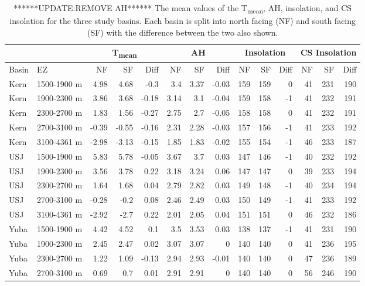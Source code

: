 \begin{table}[htbp]
\centering
\caption{******UPDATE:REMOVE AH****** The mean values of the T\textsubscript{mean}, AH, insolation, and CS insolation for the three study basins. Each basin is split into north facing (NF) and south facing (SF) with the difference between the two also shown.}
\label{tab:met_metric_table}
\tiny 
\begin{tabular}{llrrrrrrrrrrrr}
\toprule
& & \multicolumn{3}{c}{T\textsubscript{mean}} & \multicolumn{3}{c}{AH} & \multicolumn{3}{c}{Insolation} & \multicolumn{3}{c}{CS Insolation} \\
\midrule
Basin & EZ & NF & SF & Diff & NF & SF & Diff & NF & SF & Diff & NF & SF & Diff \\
\midrule
Kern & 1500-1900 m & 4.98 & 4.68 & -0.3 & 3.4 & 3.37 & -0.03 & 159 & 159 & 0 & 41 & 231 & 190 \\
Kern & 1900-2300 m & 3.86 & 3.68 & -0.18 & 3.14 & 3.1 & -0.04 & 159 & 158 & -1 & 41 & 232 & 191 \\
Kern & 2300-2700 m & 1.83 & 1.56 & -0.27 & 2.75 & 2.7 & -0.05 & 158 & 158 & 0 & 41 & 232 & 191 \\
Kern & 2700-3100 m & -0.39 & -0.55 & -0.16 & 2.31 & 2.28 & -0.03 & 157 & 156 & -1 & 41 & 233 & 192 \\
Kern & 3100-4361 m & -2.98 & -3.13 & -0.15 & 1.85 & 1.83 & -0.02 & 155 & 154 & -1 & 46 & 233 & 187 \\
USJ & 1500-1900 m & 5.83 & 5.78 & -0.05 & 3.67 & 3.7 & 0.03 & 147 & 146 & -1 & 40 & 232 & 192 \\
USJ & 1900-2300 m & 3.56 & 3.78 & 0.22 & 3.18 & 3.24 & 0.06 & 147 & 147 & 0 & 39 & 233 & 194 \\
USJ & 2300-2700 m & 1.64 & 1.68 & 0.04 & 2.79 & 2.82 & 0.03 & 149 & 148 & -1 & 40 & 234 & 194 \\
USJ & 2700-3100 m & -0.28 & -0.2 & 0.08 & 2.46 & 2.49 & 0.03 & 150 & 149 & -1 & 41 & 233 & 192 \\
USJ & 3100-4361 m & -2.92 & -2.7 & 0.22 & 2.01 & 2.05 & 0.04 & 151 & 151 & 0 & 46 & 232 & 186 \\
Yuba & 1500-1900 m & 4.42 & 4.52 & 0.1 & 3.5 & 3.53 & 0.03 & 138 & 137 & -1 & 41 & 231 & 190 \\
Yuba & 1900-2300 m & 2.45 & 2.47 & 0.02 & 3.07 & 3.07 & 0 & 140 & 140 & 0 & 41 & 236 & 195 \\
Yuba & 2300-2700 m & 1.22 & 1.09 & -0.13 & 2.94 & 2.93 & -0.01 & 140 & 140 & 0 & 47 & 236 & 189 \\
Yuba & 2700-3100 m & 0.69 & 0.7 & 0.01 & 2.91 & 2.91 & 0 & 140 & 140 & 0 & 56 & 246 & 190 \\
\bottomrule
\end{tabular}
\end{table}

